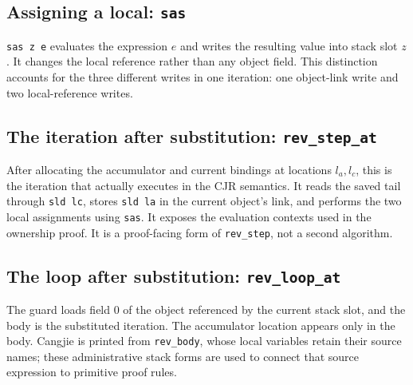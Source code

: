 \documentclass[11pt]{article}
\begin{document}
\subsection{Assigning a local: \texttt{sas}}

\begin{minipage}{\linewidth}

\end{minipage}

\texttt{sas z e} evaluates the expression \(e\) and writes the resulting value
into stack slot \(z\). It changes the local reference rather than any object
field. This distinction accounts for the three different writes in one
iteration: one object-link write and two local-reference writes.

\subsection{The iteration after substitution: \texttt{rev\_step\_at}}

\begin{minipage}{\linewidth}

\end{minipage}

After allocating the accumulator and current bindings at locations
\(l_a,l_c\), this is the iteration that actually executes in the CJR semantics.
It reads the saved tail through \texttt{sld lc}, stores \texttt{sld la} in the
current object's link, and performs the two local assignments using
\texttt{sas}. It exposes the evaluation contexts used in the ownership proof.
It is a proof-facing form of \texttt{rev\_step}, not a second algorithm.

\subsection{The loop after substitution: \texttt{rev\_loop\_at}}

\begin{minipage}{\linewidth}

\end{minipage}

The guard loads field \(0\) of the object referenced by the current stack
slot, and the body is the substituted iteration. The accumulator location
appears only in the body. Cangjie is printed from \texttt{rev\_body}, whose
local variables retain their source names; these administrative stack forms
are used to connect that source expression to primitive proof rules.
\end{document}
